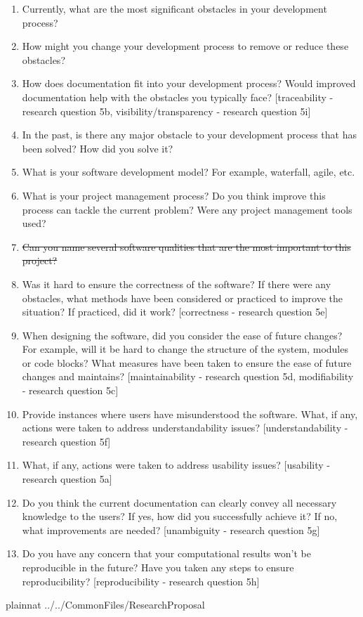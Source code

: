 \documentclass[12pt]{article}
\begin{document}
\begin{enumerate}
\item Currently, what are the most significant obstacles in your development
process?
\item How might you change your development process to remove or reduce these
obstacles?
\item How does documentation fit into your development process? Would improved
documentation help with the obstacles you typically face? [traceability - research question 5b, visibility/transparency - research question 5i]
\item In the past, is there any major obstacle to your development process that
has been solved? How did you solve it?
\item What is your software development model? For example, waterfall, agile, etc.
\item What is your project management process? Do you think improve this process
can tackle the current problem? Were any project management tools used?
\item \sout{Can you name several software qualities that are the most important to
this project?}
\item Was it hard to ensure the correctness of the software? If there were any
 obstacles, what methods have been considered or practiced to improve the situation? If practiced, did it work? [correctness - research question 5e]
\item When designing the software, did you consider the ease of future changes?
 For example, will it be hard to change the structure of the system, modules or code blocks? What measures have been taken to ensure the ease of future changes and maintains? [maintainability - research question 5d, modifiability - research question 5c]
\item Provide instances where users have misunderstood the software. What, if any, actions were taken to address understandability issues? [understandability - research question 5f]
\item What, if any, actions were taken to address usability issues? [usability - research question 5a]
\item Do you think the current documentation can clearly convey all necessary
knowledge to the users? If yes, how did you successfully achieve it? If no, what
improvements are needed? [unambiguity - research question 5g]
\item Do you have any concern that your computational results won't be
reproducible in the future? Have you taken any steps to ensure reproducibility? [reproducibility - research question 5h]
\end{enumerate}

\newpage

 {plainnat}
 {../../CommonFiles/ResearchProposal}
\end{document}
